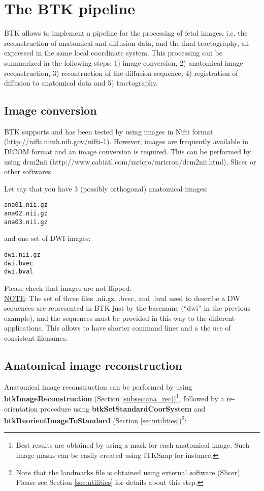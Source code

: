 \section{The BTK pipeline}
BTK allows to implement a pipeline for the processing of fetal images,
i.e. the reconstruction of anatomical and diffusion data, and the final
tractography, all expressed in the same local coordinate system. This
processing can be summarized in the following steps: 1) image conversion, 2) anatomical image reconstruction, 3)
recontruction of the diffusion sequence, 4) registration of diffusion to anatomical data and 5)
tractography.

\subsection{Image conversion}
BTK supports and has been tested by using images in Nifti format
(http://nifti.nimh.nih.gov/nifti-1). However, images are frequently available in
DICOM format and an image conversion is required. This can be performed by using
dcm2nii (http://www.cabiatl.com/mricro/mricron/dcm2nii.html), Slicer or other softwares.

Let say that you have 3 (possibly orthogonal) anatomical images:
\begin{verbatim}
ana01.nii.gz 
ana02.nii.gz 
ana03.nii.gz 
\end{verbatim}

and one set of DWI images: 
\begin{verbatim}
dwi.nii.gz
dwi.bvec 
dwi.bval 
\end{verbatim}

Please check that images are not flipped.\\

\underline{NOTE}: The set of three files .nii.gz, .bvec, and .bval used to
describe a DW sequences are represented in BTK just by the basename (``dwi'' in
the previous example), and the sequences must be provided in this way to the
different applications. This allows to have shorter command lines and a the use
of consistent filenames.

\subsection{Anatomical image reconstruction}
Anatomical image reconstruction can be performed by using \textbf{btkImageReconstruction} (Section
\ref{subsec:ana_rec})\footnote{Best results are obtained by using a mask for each anatomical image. Such image masks can be easily created using ITKSnap for instance.}, followed by a re-orientation procedure using \textbf{btkSetStandardCoorSystem} and \textbf{btkReorientImageToStandard} (Section \ref{sec:utilities})\footnote{Note that the landmarks file is obtained using external software (Slicer). Please see Section \ref{sec:utilities} for details about this step.}:

